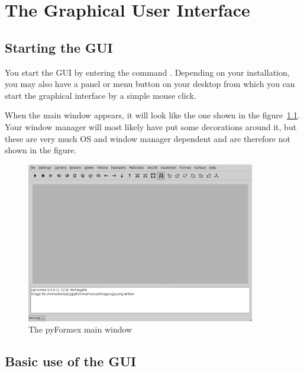 
\chapter{The Graphical User Interface}
\label{cha:gui}

\section{Starting the GUI}
You start the \pyf GUI by entering the command . Depending on your installation, you may also have a panel or menu button on your desktop from which you can start the \pyf graphical interface by a simple mouse click. 

When the main window appears, it will look like the one shown in the figure~\ref{fig:gui}. Your window manager will most likely have put some decorations around it, but these are very much OS and window manager dependent and are therefore not shown in the figure.

\begin{figure}[ht]
  \centering
  \begin{makeimage}
  \end{makeimage}
  \begin{latexonly}
    \includegraphics[width=10cm]{images/gui}
  \end{latexonly}
  \begin{htmlonly}
  \end{htmlonly}  
  \caption{The pyFormex main window}
  \label{fig:gui}
\end{figure}

\section{Basic use of the GUI}

